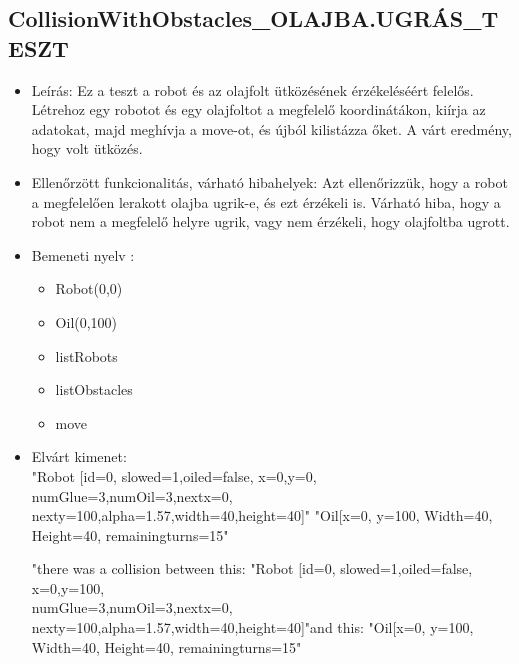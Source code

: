 \subsection{CollisionWithObstacles\_OLAJBA.UGRÁS\_TESZT}
\begin{itemize}
	\item Leírás: Ez a teszt a robot és az olajfolt ütközésének érzékeléséért felelős.
	                Létrehoz egy robotot és egy olajfoltot a megfelelő koordinátákon, kiírja az adatokat, majd meghívja a move-ot, és újból kilistázza őket. A várt eredmény, hogy volt ütközés.
\newline
	\item  Ellenőrzött funkcionalitás, várható hibahelyek: Azt ellenőrizzük, hogy a robot a megfelelően lerakott olajba ugrik-e, és ezt érzékeli is.
		   Várható hiba, hogy a robot nem a megfelelő helyre ugrik, vagy nem érzékeli, hogy olajfoltba ugrott.
	\item Bemeneti nyelv :
		\begin{itemize}
		\item Robot(0,0)
		\item Oil(0,100)
		\item listRobots
		\item listObstacles
		\item move
		\end{itemize}
	
	\item Elvárt kimenet: \\
		"Robot [id=0,  slowed=1,oiled=false, x=0,y=0, 
		\\numGlue=3,numOil=3,nextx=0,
		\\nexty=100,alpha=1.57,width=40,height=40]"\newline
		"Oil[x=0, y=100, Width=40, Height=40, remainingturns=15"\newline
		
		"there was a collision between this: "Robot [id=0,  slowed=1,oiled=false, x=0,y=100, 
		\\numGlue=3,numOil=3,nextx=0,
		\\nexty=100,alpha=1.57,width=40,height=40]"\newline and this: "Oil[x=0, y=100, Width=40, Height=40, remainingturns=15"\newline
\end{itemize}


